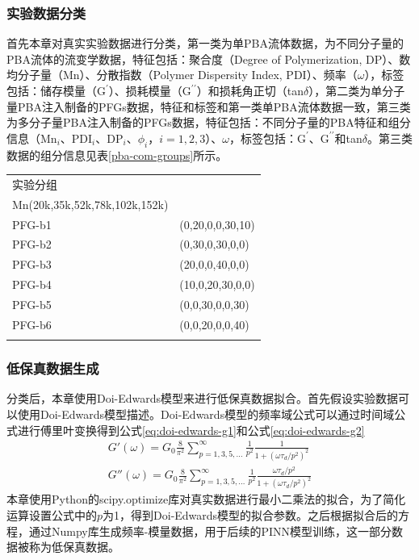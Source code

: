 \subsubsection{实验数据分类}
首先本章对真实实验数据进行分类，第一类为单PBA流体数据，为不同分子量的PBA流体的流变学数据，特征包括：聚合度（Degree of Polymerization, DP）、数均分子量（Mn）、分散指数（Polymer Dispersity Index, PDI）、频率（$\omega$），标签包括：储存模量（$\mathrm{G^{\prime}}$）、损耗模量（$\mathrm{G^{\prime\prime}}$）和损耗角正切（tan$\delta$），第二类为单分子量PBA注入制备的PFGs数据，特征和标签和第一类单PBA流体数据一致，第三类为多分子量PBA注入制备的PFGs数据，特征包括：不同分子量的PBA特征和组分信息（Mn$_i$、PDI$_i$、DP$_i$、$\phi_i$，$i=1,2,3$）、$\omega$，标签包括：$\mathrm{G^{\prime}}$、$\mathrm{G^{\prime\prime}}$和tan$\delta$。第三类数据的组分信息见表\ref{pba-com-groups}所示。
\begin{table}
  \centering
  \small
  \begin{tabularx}{\textwidth}{>{\centering\arraybackslash}X >{\centering\arraybackslash}X} %
    \Xhline{1.5pt}
    实验分组   & \makecell{
      \begin{tabular}{@{}c@{}}
        $\phi_{PBA}(\%)$ \\
        \Xhline{0.5pt}
        Mn(20k,35k,52k,78k,102k,152k)
      \end{tabular}
    }                         \\
    \Xhline{0.5pt}
    PFG-b1 & (0,20,0,0,30,10) \\
    PFG-b2 & (0,30,0,30,0,0)  \\
    PFG-b3 & (20,0,0,40,0,0)  \\
    PFG-b4 & (10,0,20,30,0,0) \\
    PFG-b5 & (0,0,30,0,0,30)  \\
    PFG-b6 & (0,0,20,0,0,40)  \\
    \Xhline{1.5pt}
  \end{tabularx}
\end{table}
\subsubsection{低保真数据生成}
分类后，本章使用Doi-Edwards模型来进行低保真数据拟合。首先假设实验数据可以使用Doi-Edwards模型描述。Doi-Edwards模型的频率域公式可以通过时间域公式进行傅里叶变换得到公式\eqref{eq:doi-edwards-g1}和公式\eqref{eq:doi-edwards-g2}
\begin{align}
  G'(\omega) = G_0 \frac{8}{\pi^2} \sum_{p=1,3,5,\ldots}^{\infty} \frac{1}{p^2} \frac{1}{1 + (\omega \tau_d / p^2)^2} \label{eq:doi-edwards-g1} \\
  G''(\omega) = G_0 \frac{8}{\pi^2} \sum_{p=1,3,5,\ldots}^{\infty} \frac{1}{p^2} \frac{\omega \tau_d / p^2}{1 + (\omega \tau_d / p^2)^2}
  \label{eq:doi-edwards-g2}
\end{align}
本章使用Python的scipy.optimize库对真实数据进行最小二乘法的拟合，为了简化运算设置公式中的$p$为1，得到Doi-Edwards模型的拟合参数。之后根据拟合后的方程，通过Numpy库生成频率-模量数据，用于后续的PINN模型训练，这一部分数据被称为低保真数据。

